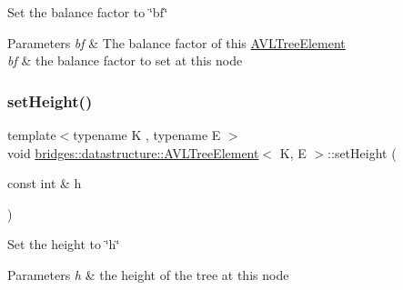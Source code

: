 Set the balance factor to \char`\"{}bf\char`\"{}
\begin{DoxyParams}{Parameters}
{\em bf} & The balance factor of this \mbox{\hyperlink{classbridges_1_1datastructure_1_1_a_v_l_tree_element}{A\+V\+L\+Tree\+Element}}\\
\hline
{\em bf} & the balance factor to set at this node \\
\hline
\end{DoxyParams}
\mbox{\label{classbridges_1_1datastructure_1_1_a_v_l_tree_element_af387bcd2b37b7284ea983acafecff93c}} 
\subsubsection{\texorpdfstring{set\+Height()}{setHeight()}}
{\footnotesize\ttfamily template$<$typename K , typename E $>$ \\
void \mbox{\hyperlink{classbridges_1_1datastructure_1_1_a_v_l_tree_element}{bridges\+::datastructure\+::\+A\+V\+L\+Tree\+Element}}$<$ K, E $>$\+::set\+Height (\begin{DoxyParamCaption}\item[{const int \&}]{h }\end{DoxyParamCaption})\hspace{0.3cm}{\ttfamily [inline]}}

Set the height to \char`\"{}h\char`\"{}


\begin{DoxyParams}{Parameters}
{\em h} & the height of the tree at this node \\
\hline
\end{DoxyParams}
\mbox{\label{classbridges_1_1datastructure_1_1_a_v_l_tree_element_af6c8a71789ff45481786fd4d63cbbcbe}} 
